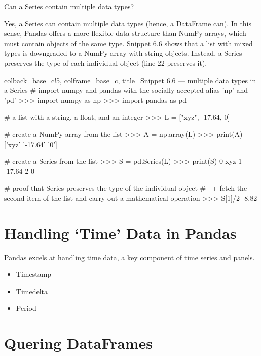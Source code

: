 \documentclass[a4paper,11pt]{book}
\numberwithin{figure}{chapter}
\numberwithin{table}{chapter}
\newcommand{\question}[1]{%
    \begin{tcolorbox}[colback=comp_c!10,colframe=comp_c,sidebyside align=top,width=\linewidth,before skip=1ex]
        #1
    \end{tcolorbox}
    \switchcolumn%
}
\newcommand{\note}[1]{%
    \begin{tcolorbox}[colback=white!0,colframe=white!10,width=\linewidth,before skip=1ex]
        #1
    \end{tcolorbox}
}
\begin{document}
\begin{paracol}{2}
	\question{\raggedright Can a Series contain multiple data types?}
	\note{Yes, a Series can contain multiple data types (hence, a DataFrame can). In this sense, Pandas offers a more flexible data structure than NumPy arrays, which must contain objects of the same type. Snippet 6.6 shows that a list with mixed types is downgraded to a NumPy array with string objects. Instead, a Series preserves the type of each individual object (line 22 preserves it). }
\end{paracol}

\begin{pythoncode}[linenos=True]{colback=base_c!5, colframe=base_c, title=\sffamily Snippet 6.6 --- multiple data types in a Series}
# import numpy and pandas with the socially accepted alias 'np' and 'pd'
>>> import numpy as np
>>> import pandas as pd

# a list with a string, a float, and an integer
>>> L = ["xyz", -17.64, 0] 

# create a NumPy array from the list
>>> A = np.array(L)
>>> print(A)
['xyz' '-17.64' '0']

# create a Series from the list
>>> S = pd.Series(L)
>>> print(S)
0      xyz
1   -17.64
2        0

# proof that Series preserves the type of the individual object
# --+ fetch the second item of the list and carry out a mathematical operation
>>> S[1]/2
-8.82
\end{pythoncode}

\section{Handling `Time' Data in Pandas}

\begin{paracol}{2}
	\question{\raggedright }
	\note{Pandas excels at handling time data, a key component of time series and panels.

	\begin{itemize}
		\item Timestamp
		\item Timedelta
		\item Period  
	\end{itemize}
	}
\end{paracol}



\section{Quering DataFrames}
\label{sec:querying_df}
\end{document}
